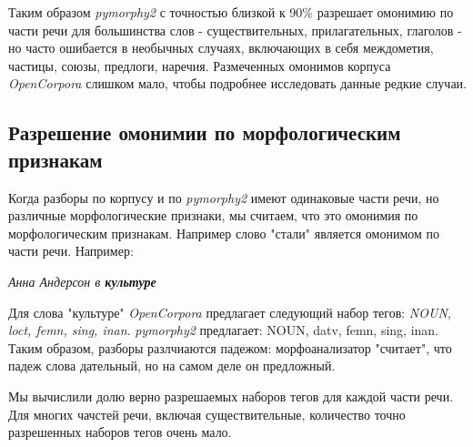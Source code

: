 \documentclass[a4paper,14pt]{article}
\begin{document}
	Таким образом \textit{pymorphy2} с точностью близкой к 90\% разрешает омонимию по части речи для большинства слов - существительных, прилагательных, глаголов - но часто ошибается в необычных случаях, включающих в себя междометия, частицы, союзы, предлоги, наречия. Размеченных омонимов корпуса \textit{OpenCorpora} слишком мало, чтобы подробнее исследовать данные редкие случаи.

	\subsection{Разрешение омонимии по морфологическим признакам}

	Когда разборы по корпусу и по \textit{pymorphy2} имеют одинаковые части речи, но различные морфологические признаки, мы считаем, что это омонимия по морфологическим признакам. Например слово "стали" является омонимом по части речи.
	Например:


	\begin{center}
		\textit{Анна Андерсон в \textbf{культуре}}
	\end{center}

	Для слова "культуре" \textit{OpenCorpora} предлагает следующий набор тегов: \textit{NOUN, loct, femn, sing, inan}. \textit{pymorphy2} предлагает: NOUN, datv, femn, sing, inan. Таким образом, разборы разлчиаются падежом: морфоанализатор "считает", что падеж слова дательный, но на самом деле он предложный.

	Мы вычислили долю верно разрешаемых наборов тегов для каждой части речи. 
	Для многих чачстей речи, включая существительные, количество точно разрешенных наборов тегов очень мало. 
\end{document}
